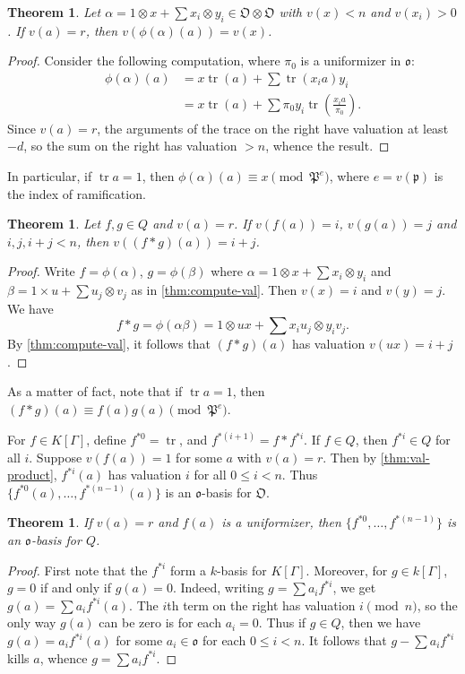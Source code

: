 \documentclass{article}
\DeclareMathOperator{\trace}{tr}
\newcommand{\fo}{\mathfrak{o}}
\newcommand{\fO}{\mathfrak{O}}
\newcommand{\fp}{\mathfrak{p}}
\newcommand{\fP}{\mathfrak{P}}
\newtheorem{theorem}[subsection]{Theorem}
\begin{document}
\begin{theorem}\label{thm:compute-val}
Let $\alpha=1\otimes x+\sum x_i\otimes y_i\in \fO\otimes\fO$ with $v(x)<n$ and 
$v(x_i)>0$. If $v(a)=r$, then $v(\phi(\alpha)(a))=v(x)$. 
\end{theorem}
\begin{proof}
Consider the following computation, where $\pi_0$ is a uniformizer in $\fo$:
\begin{align*}
  \phi(\alpha)(a) 
    &= x\trace(a) + \sum \trace(x_i a) y_i \\
    &= x\trace(a) + \sum \pi_0 y_i \trace\left(\frac{x_i a}{\pi_0}\right) .
\end{align*}
Since $v(a)=r$, the arguments of the trace on the right have valuation at 
least $-d$, so the sum on the right has valuation $>n$, whence the result. 
\end{proof}

In particular, if $\trace a=1$, then $\phi(\alpha)(a)\equiv x\pmod{\fP^e}$, where 
$e=v(\fp)$ is the index of ramification. 

\begin{theorem}\label{thm:val-product}
Let $f,g\in Q$ and $v(a)=r$. If $v(f(a))=i$, $v(g(a))=j$ and 
$i,j,i+j<n$, then $v((f\ast g)(a))=i+j$. 
\end{theorem}
\begin{proof}
Write $f=\phi(\alpha)$, $g=\phi(\beta)$ where 
$\alpha=1\otimes x+\sum x_i\otimes y_i$ and 
$\beta=1\times u+\sum u_j\otimes v_j$ as in 
\autoref{thm:compute-val}. Then $v(x)=i$ and $v(y)=j$. We have 
\[
  f\ast g=\phi(\alpha\beta) = 1\otimes u x+\sum x_i u_j\otimes y_i v_j .
\]
By \autoref{thm:compute-val}, it follows that $(f\ast g)(a)$ has valuation 
$v(u x)=i+j$. 
\end{proof}

As a matter of fact, note that if $\trace a=1$, then 
$(f\ast g)(a)\equiv f(a) g(a)\pmod{\fP^e}$. 

For $f\in K[\Gamma]$, define $f^{\ast 0}=\trace$, and 
$f^{\ast(i+1)}=f\ast f^{\ast i}$. If $f\in Q$, then $f^{\ast i}\in Q$ for all 
$i$. Suppose $v(f(a))=1$ for some $a$ with $v(a)=r$. Then by 
\autoref{thm:val-product}, $f^{\ast i}(a)$ has valuation $i$ for all 
$0\leqslant i < n$. Thus $\{f^{\ast 0}(a),\dots,f^{\ast(n-1)}(a)\}$ is an 
$\fo$-basis for $\fO$. 

\begin{theorem}
If $v(a)=r$ and $f(a)$ is a uniformizer, then 
$\{f^{\ast 0},\dots,f^{\ast(n-1)}\}$ is an $\fo$-basis for $Q$. 
\end{theorem}
\begin{proof}
First note that the $f^{\ast i}$ form a $k$-basis for $K[\Gamma]$. Moreover, 
for $g\in k[\Gamma]$, $g=0$ if and only if $g(a)=0$. Indeed, writing  
$g=\sum a_i f^{\ast i}$, we get $g(a)=\sum a_i f^{\ast i}(a)$. The $i$th term 
on the right has valuation $i\pmod n$, so the only way $g(a)$ can be zero is 
for each $a_i=0$. Thus if $g\in Q$, then we have $g(a)=a_i f^{\ast i}(a)$ for 
some $a_i\in \fo$ for each $0\leqslant i<n$. It follows that 
$g-\sum a_i f^{\ast i}$ kills $a$, whence $g=\sum a_i f^{\ast i}$. 
\end{proof}
\end{document}

